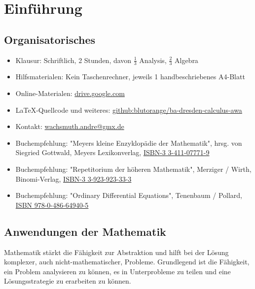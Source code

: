 \chapter{Einführung}

\section{Organisatorisches}

\begin{itemize}
	\item Klausur: Schriftlich, 2 Stunden, davon $\frac{1}{3}$ Analysis, $\frac{2}{3}$ Algebra
	\item Hilfsmaterialen: Kein Taschenrechner, jeweils 1 handbeschriebenes A4-Blatt
	\item Online-Materialen: \href{https://drive.google.com/drive/folders/1CJ0226zg1_bnbt7IopCLwDuK2hkOgHya?usp=sharing}{drive.google.com}
	\item \LaTeX-Quellcode und weiteres: \href{https://github.com/blutorange/ba-dresden-calculus-awa}{github:blutorange/ba-dresden-calculus-awa}
	\item Kontakt: \href{mailto:wachsmuth.andre@gmx.de?subject=BA/Analysis 2020: }{wachsmuth.andre@gmx.de}
	\item Buchempfehlung: "Meyers kleine Enzyklopädie der Mathematik", hrsg. von Siegried Gottwald, Meyers Lexikonverlag, \href{https://www.amazon.de/-/en/Siegfried-Gottwald/dp/3411077719}{ISBN-3 3-411-07771-9}
	\item Buchempfehlung: "Repetitorium der höheren Mathematik", Merziger / Wirth, Binomi-Verlag, \href{https://www.amazon.de/-/en/Gerhard-Merziger/dp/3923923333}{ISBN-3 3-923-923-33-3}
    \item Buchempfehlung: "Ordinary Differential Equations", Tenenbaum / Pollard, \href{https://www.lehmanns.de/shop/mathematik-informatik/1860759-9780486649405-ordinary-differential-equations}{ISBN 978-0-486-64940-5}
\end{itemize}

\section{Anwendungen der Mathematik}

Mathematik stärkt die Fähigkeit zur Abstraktion und hilft bei der Lösung komplexer, auch nicht-mathematischer, Probleme. Grundlegend
ist die Fähigkeit, ein Problem analysieren zu können, es in Unterprobleme zu teilen und eine Lösungsstrategie zu erarbeiten zu können.

